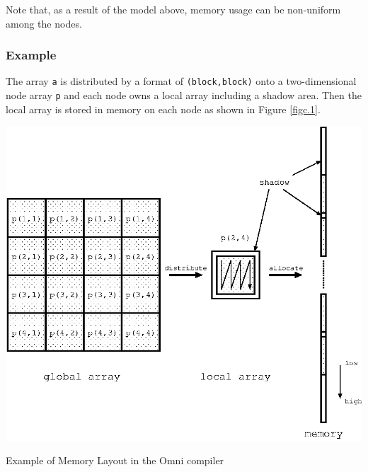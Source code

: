 Note that, as a result of the model above, memory usage can be
non-uniform among the nodes.

\subsubsection*{Example}


The array {\tt a} is distributed by a format of {\tt (block,block)} onto
a two-dimensional node array {\tt p} and each node owns a local array
including a shadow area. Then the local array is stored in memory on
each node as shown in Figure \ref{figc.1}.

\begin{myfigure}
 \includegraphics[scale=0.9]{figs/figc.1.eps}
 \caption{Example of Memory Layout in the Omni {\XMP} compiler}
 \label{figc.1}
\end{myfigure}
